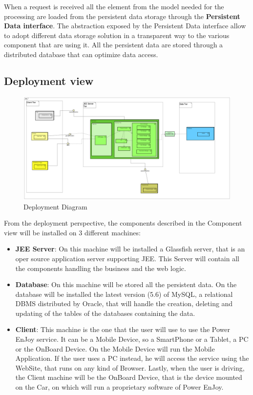 When a request is received all the element from the model needed for the processing are loaded from the persistent data storage through the \textbf{Persistent Data interface}. The abstraction exposed by the Persistent Data interface allow to adopt different data storage solution in a transparent way to the various component that are using it. All the persistent data are stored through a distributed database that can optimize data access.

\newpage

\subsection{Deployment view}\label{deployment}
 	
\begin{figure}[H]	
	\centering
	\includegraphics[width=\textwidth]{img/deployment_diagram}
	\caption{Deployment Diagram}
\end{figure}

From the deployment perspective, the components described in the Component view will be installed on 3 different machines:

\begin{itemize}
\item \textbf{JEE Server}: On this machine will be installed a Glassfish server, that is an oper source application server supporting JEE. This Server will contain all the components handling the business and the web logic.
\item \textbf{Database}: On this machine will be stored all the persistent data. On the database will be installed the latest version (5.6) of MySQL, a relational DBMS distributed by Oracle, that will handle the creation, deleting and updating of the tables of the databases containing the data.
\item \textbf{Client}: This machine is the one that the user will use to use the Power EnJoy service. It can be a Mobile Device, so a SmartPhone or a Tablet, a PC or the OnBoard Device. On the Mobile Device will run the Mobile Application. If the user uses a PC instead, he will access the service using the WebSite, that runs on any kind of Browser. Lastly, when the user is driving, the Client machine will be the OnBoard Device, that is the device mounted on the Car, on which will run a proprietary software of Power EnJoy.
\end{itemize}

